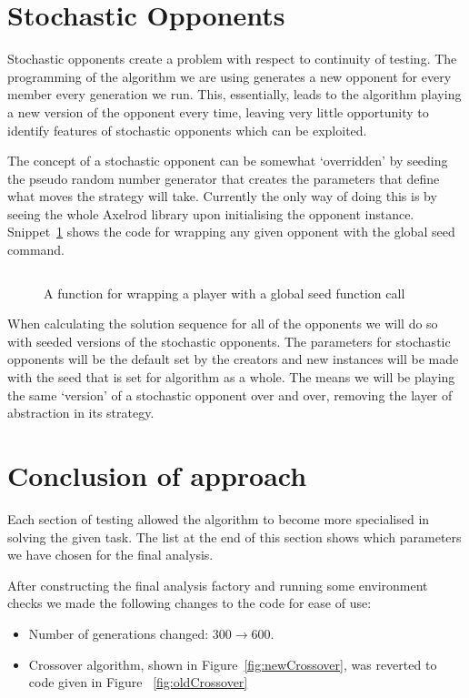 \section{Stochastic Opponents}\label{sec:stochasticOpponents}
Stochastic opponents create a problem with respect to continuity of testing.
The programming of the algorithm we are using generates a new opponent for every member every generation we run.
This, essentially, leads to the algorithm playing a new version of the opponent every time, leaving very little opportunity to identify features of stochastic opponents which can be exploited.

The concept of a stochastic opponent can be somewhat `overridden' by seeding the pseudo random number generator that creates the parameters that define what moves the strategy will take.
Currently the only way of doing this is by seeing the whole Axelrod library upon initialising the opponent instance.
Snippet~\ref{code:wrappingFunction} shows the code for wrapping any given opponent with the global seed command.

\begin{figure}[h]
    \inputminted{python}{code_snippets/classWrappingFunction.py}
    \caption{A function for wrapping a player with a global seed function call}\label{code:wrappingFunction}
\end{figure}

When calculating the solution sequence for all of the opponents we will do so with seeded versions of the stochastic opponents.
The parameters for stochastic opponents will be the default set by the creators and new instances will be made with the seed that is set for algorithm as a whole.
The means we will be playing the same `version' of a stochastic opponent over and over, removing the layer of abstraction in its strategy.

\section{Conclusion of approach}\label{sec:conclusionOfApproach}
Each section of testing allowed the algorithm to become more specialised in solving the given task.
The list at the end of this section shows which parameters we have chosen for the final analysis.

After constructing the final analysis factory and running some environment checks we made the following changes to the code for ease of use:
\begin{itemize}
    \item Number of generations changed: $300\rightarrow600$.
    \item Crossover algorithm, shown in Figure~\ref{fig:newCrossover}, was reverted to code given in Figure ~\ref{fig:oldCrossover}
\end{itemize}


